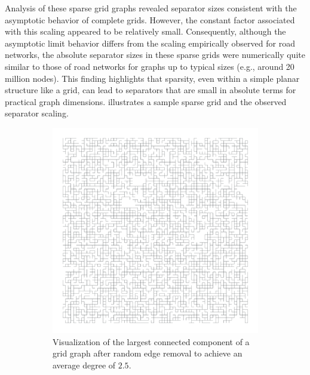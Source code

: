 Analysis of these sparse grid graphs revealed separator sizes consistent with the  asymptotic behavior of complete grids.
However, the constant factor associated with this scaling appeared to be relatively small.
Consequently, although the asymptotic limit behavior differs from the  scaling empirically observed for road networks, the absolute separator sizes in these sparse grids were numerically quite similar to those of road networks for graphs up to typical sizes (e.g., around 20 million nodes).
This finding highlights that sparsity, even within a simple planar structure like a grid, can lead to separators that are small in absolute terms for practical graph dimensions.
 illustrates a sample sparse grid and the observed separator scaling.

\begin{figure}
    \centering
    \begin{subfigure}{0.35\linewidth}
        \centering
        \includegraphics[width=\linewidth]{graphics/grid_avg_deg.png} 
        \caption{Visualization of the largest connected component of a grid graph after random edge removal to achieve an average degree of \(2.5\).}
        \label{fig:sparse_grid_viz} %
    \end{subfigure}
    \hfill
    \begin{subfigure}{0.55\linewidth}

\end{subfigure}
\end{figure}

